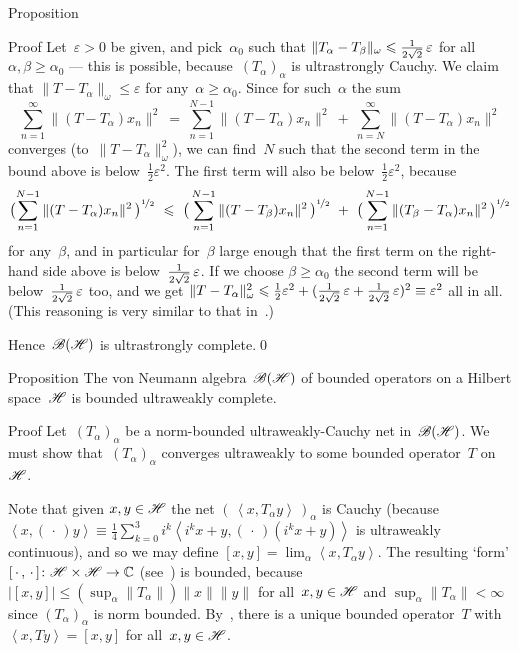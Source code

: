 \documentclass[a]{subfiles}
\begin{document}
\begin{parsec}
\begin{point}[bh-us-complete]{Proposition}
\begin{point}{Proof}
Let~$\varepsilon>0$ be given,
and pick~$\alpha_0$
such that $\|T_\alpha-T_\beta\|_\omega \leq 
\smash{\frac{1}{2\sqrt{2}}}\,\varepsilon$
for all~$\alpha,\beta\geq \alpha_0$
--- this is possible, because~$(T_\alpha)_\alpha$ is ultrastrongly Cauchy.
We claim that $\|T-T_\alpha\|_\omega \leq \varepsilon$
for any~$\alpha\geq \alpha_0$.
Since for such~$\alpha$
the sum
\begin{equation*}
	\sum_{n=1}^\infty \|(T-T_\alpha)x_n\|^2 
	\ = \ 
	\sum_{n=1}^{N-1} \|(T-T_\alpha)x_n\|^2
	\ +\ 
	\sum_{n=N}^\infty
	\|(T-T_\alpha)x_n\|^2
\end{equation*}
converges (to~$\|T-T_\alpha\|_\omega^2$),
we can find~$N$ such that the second term in the bound above
is below~$\frac{1}{2}\varepsilon^2$.
The first term will also be below~$\frac{1}{2}\varepsilon^2$,
because
\begin{equation*}
	\bigl(\sum_{n=1}^{N-1} \|(T - T_\alpha)x_n\|^2\,\bigr)^{\nicefrac{1}{2}}
	\ \leq\ 
\bigl(\,
\sum_{n=1}^{N-1} \|(T-T_{\beta})x_n\|^2
\,\bigr)^{\nicefrac{1}{2}}
\ +\ 
\bigl(\,
\sum_{n=1}^{N-1} \|(T_\beta-T_\alpha)x_n\|^2
\,\bigr)^{\nicefrac{1}{2}}
\end{equation*}
for any~$\beta$,
and in particular for~$\beta$
large enough that the first term on the right-hand side above
is below~$\smash{\frac{1}{2\sqrt{2}}}\,\varepsilon$.
If we choose $\beta\geq \alpha_0$
the second term will be below~$\smash{\frac{1}{2\sqrt{2}}}\,\varepsilon$ too,
and we get $\|T-T_\alpha\|_\omega^2 \leq \frac{1}{2}\varepsilon^2
+ (\smash{\frac{1}{2\sqrt{2}}\,\varepsilon 
+ \frac{1}{2\sqrt{2}}\,\varepsilon})^2
\equiv \varepsilon^2$ 
all in all.
(This reasoning is very similar to that in~.)

Hence~$\scrB(\scrH)$ is ultrastrongly complete.\qed
\end{point}
\end{point}
\begin{point}[bh-bounded-uw-complete]{Proposition}%
The von Neumann algebra~$\scrB(\scrH)$
of bounded operators on a Hilbert space~$\scrH$
is bounded ultraweakly complete.
\begin{point}{Proof}%
Let~$(T_\alpha)_\alpha$ be a norm-bounded ultraweakly-Cauchy net
in~$\scrB(\scrH)$.
We must show that~$(T_\alpha)_\alpha$
converges ultraweakly
to some bounded operator~$T$ on~$\scrH$.

Note that given $x,y\in\scrH$
the net $(\,\left<x,T_\alpha y\right>\,)_\alpha$
is Cauchy
(because $\left<x,(\,\cdot\,)y\right>
\equiv \frac{1}{4}\sum_{k=0}^3 i^k\left<i^kx+y,(\,\cdot\,)(i^kx+y)\right>$
is ultraweakly continuous),
and so we may define $[x,y] = \lim_\alpha \left<x,T_\alpha y\right>$.
The resulting `form'
$[\,\cdot\,,\,\cdot\,]\colon \scrH\times\scrH\to \C$
(see~\sref{chilb-form})
is bounded, 
because~$\left|[x,y]\right| \leq (\sup_\alpha \|T_\alpha\|)\|x\|\|y\|$
for all~$x,y\in\scrH$
and $\sup_\alpha\|T_\alpha\|<\infty$
since $(T_\alpha)_\alpha$
is norm bounded.
By~,
there is a unique bounded operator~$T$
with $\left<x,Ty\right>=[x,y]$
for all~$x,y\in\scrH$.


\end{point}
\end{point}
\end{parsec}
\end{document}
